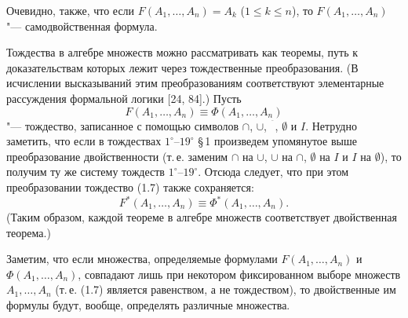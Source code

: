 %
Очевидно, также, что если $F(A_1,\dots,A_n)=A_k$ ($1\le k\le n$), то
$F(A_1,\dots,A_n)$ "--- самодвойственная формула.

Тождества в алгебре множеств можно рассматривать как теоремы, путь
к доказательствам которых лежит через тождественные преобразования.
(В исчислении высказываний этим преобразованиям соответствуют элементарные
рассуждения формальной логики [24, 84].) Пусть
\begin{equation}\tag{1.7}
F(A_1,\dots,A_n)\equiv\Phi(A_1,\dots,A_n)
\end{equation}
"--- тождество, записанное с помощью символов $\cap$, $\cup$,
${}^{\overline{\phantom{a}}}$, $\emptyset$ и $I$. Нетрудно заметить, что
если в тождествах $1^\circ$--$19^\circ$ \S\,1 произведем упомянутое выше
преобразование двойственности (т.\,е. заменим $\cap$ на $\cup$, $\cup$ на
$\cap$, $\emptyset$ на $I$ и $I$ на $\emptyset$), то получим ту же систему
тождеств $1^\circ$--$19^\circ$. Отсюда следует, что при этом
преобразовании тождество (1.7) также сохраняется:
\begin{equation}\tag{1.8}
F^*(A_1,\dots,A_n)\equiv\Phi^*(A_1,\dots,A_n).
\end{equation}
(Таким образом, каждой теореме в алгебре множеств соответствует
двойственная теорема.)

Заметим, что если множества, определяемые формулами $F(A_1,\dots,A_n)$
и $\Phi(A_1,\dots,A_n)$, совпадают лишь при некотором фиксированном выборе
множеств $A_1,\dots,A_n$ (т.\,е. (1.7) является равенством, а не
тождеством), то двойственные им формулы будут, вообще, определять
различные множества.

\begin{figure}[h]
\centering
{}
\end{figure}

